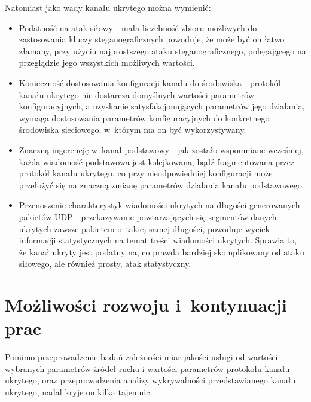 \documentclass[a4paper, twoside, openright, 12pt]{report}
\begin{document}
    Natomiast jako wady kanału ukrytego można wymienić:
    \begin{itemize}
        \item Podatność na atak siłowy - mała liczebność zbioru możliwych do zastosowania
            kluczy steganograficznych powoduje, że może być on łatwo złamany,
            przy użyciu najprostszego ataku steganograficznego, polegającego
            na przeglądzie jego wszystkich możliwych wartości.
        \item Konieczność dostosowania konfiguracji kanału do środowiska - protokół
            kanału ukrytego nie dostarcza domyślnych wartości parametrów konfiguracyjnych, a
            uzyskanie satysfakcjonujących parametrów jego działania, wymaga dostosowania
            parametrów konfiguracyjnych do konkretnego środowiska sieciowego,
            w~którym ma on być wykorzystywany.
        \item Znaczną ingerencję w~kanał podstawowy - jak zostało wspomniane wcześniej,
            każda wiadomość podstawowa jest kolejkowana, bądź fragmentowana przez
            protokół kanału ukrytego, co przy nieodpowiedniej konfiguracji może
            przełożyć się na znaczną zmianę parametrów działania kanału podstawowego.
        \item Przenoszenie charakterystyk wiadomości ukrytych na długości generowanych pakietów UDP -
            przekazywanie powtarzających się segmentów danych ukrytych
            zawsze pakietem o~takiej samej długości, powoduje wyciek informacji
            statystycznych na temat treści wiadomości ukrytych. Sprawia to, że
            kanał ukryty jest podatny na, co prawda bardziej skomplikowany od ataku siłowego,
            ale również prosty, atak statystyczny.

    \end{itemize}
\chapter{Możliwości rozwoju i~kontynuacji prac}
    Pomimo przeprowadzenie badań zależności miar jakości usługi od wartości wybranych
    parametrów źródeł ruchu i wartości parametrów protokołu kanału ukrytego,
    oraz przeprowadzenia analizy wykrywalności przedstawianego kanału ukrytego, nadal kryje on kilka tajemnic.
\end{document}

